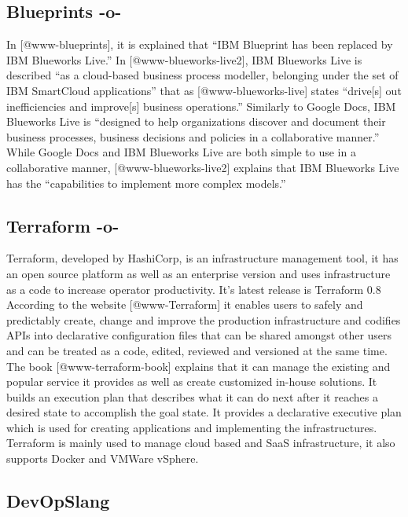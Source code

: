 \subsection{Blueprints -o-}

In [@www-blueprints], it is explained that ``IBM Blueprint has
been replaced by IBM Blueworks Live.'' In [@www-blueworks-live2],
IBM Blueworks Live is described ``as a cloud-based business process
modeller, belonging under the set of IBM SmartCloud applications''
that as [@www-blueworks-live] states ``drive[s] out
inefficiencies and improve[s] business operations.'' Similarly to
Google Docs, IBM Blueworks Live is ``designed to help organizations
discover and document their business processes, business decisions and
policies in a collaborative manner.'' While Google Docs and IBM
Blueworks Live are both simple to use in a collaborative manner,
 [@www-blueworks-live2] explains that IBM Blueworks Live has the
``capabilities to implement more complex models.''

\subsection{Terraform -o-}

Terraform, developed by HashiCorp, is an infrastructure management
tool, it has an open source platform as well as an enterprise version
and uses infrastructure as a code to increase operator
productivity. It's latest release is Terraform 0.8 According to the
website [@www-Terraform] it enables users to safely and
predictably create, change and improve the production infrastructure
and codifies APIs into declarative configuration files that can be
shared amongst other users and can be treated as a code, edited,
reviewed and versioned at the same time. The
book [@www-terraform-book] explains that it can manage the
existing and popular service it provides as well as create customized
in-house solutions. It builds an execution plan that describes what it
can do next after it reaches a desired state to accomplish the goal
state. It provides a declarative executive plan which is used for
creating applications and implementing the infrastructures. Terraform
is mainly used to manage cloud based and SaaS infrastructure, it also
supports Docker and VMWare vSphere.
     
\subsection{DevOpSlang}
     
